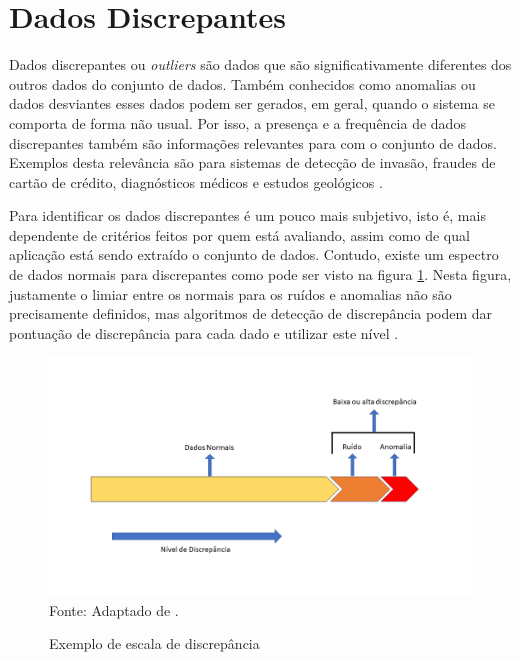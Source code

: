 \documentclass[
	12pt,				%
	openright,			%
	oneside,			%
	a4paper,			%
	english,			%
	brazil				%
	]{abntex2}
\begin{document}
	\section{Dados Discrepantes}
		Dados discrepantes ou \emph{outliers} são dados que são significativamente diferentes dos outros dados do conjunto de dados.
		Também conhecidos como anomalias ou dados desviantes esses dados podem ser gerados, em geral, quando o sistema se comporta de forma não usual.
		Por isso, a presença e a frequência de dados discrepantes também são informações relevantes para com o conjunto de dados.
		Exemplos desta relevância são para sistemas de detecção de invasão, fraudes de cartão de crédito, diagnósticos médicos e estudos geológicos \cite{Aggarwal2012}.
		\par
		Para identificar os dados discrepantes é um pouco mais subjetivo, isto é, mais dependente de critérios feitos por quem está avaliando, assim como de qual aplicação está sendo extraído o conjunto de dados.
		Contudo, existe um espectro de dados normais para discrepantes como pode ser visto na figura \ref{fig:Aggarwal}.
		Nesta figura, justamente o limiar entre os normais para os ruídos e anomalias não são precisamente definidos,
		mas algoritmos de detecção de discrepância podem dar pontuação de discrepância para cada dado e utilizar este nível \cite{Aggarwal2012}.

		\begin{figure}[!h]
			\centering
			\caption{Exemplo de escala de discrepância}
			\includegraphics[width=\linewidth]{./figures/FundamentacaoTeorica/ExemploDeDiscrepancia.png}
			\label{fig:Aggarwal}
			\footnotesize Fonte: Adaptado de \cite{Aggarwal2012}.
		\end{figure}
		
\end{document}
